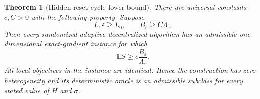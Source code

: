 \documentclass[11pt,a4paper]{article}
\newcommand{\E}{\mathbb{E}}
\newcommand{\eps}{\varepsilon}
\newtheorem{theorem}{Theorem}[section]
\theoremstyle{remark}
\begin{document}
\begin{theorem}[Hidden reset-cycle lower bound]
\label{thm:coarse-reset-lower}
There are universal constants $c,C>0$ with the following property.  Suppose
\begin{equation}
 L_1\eps\ge L_0,
 \qquad
 B_\eps\ge C\Lambda_\eps.
 \label{eq:coarse-reset-regime}
\end{equation}
Then every randomized adaptive decentralized algorithm has an admissible
one-dimensional exact-gradient instance for which
\begin{equation}
 \boxed{
 \E S\ge c\frac{B_\eps}{\Lambda_\eps}.}
 \label{eq:coarse-B-lower}
\end{equation}
All local objectives in the instance are identical.  Hence the construction
has zero heterogeneity and its deterministic oracle is an admissible subclass
for every stated value of $H$ and $\sigma$.
\end{theorem}
\end{document}
